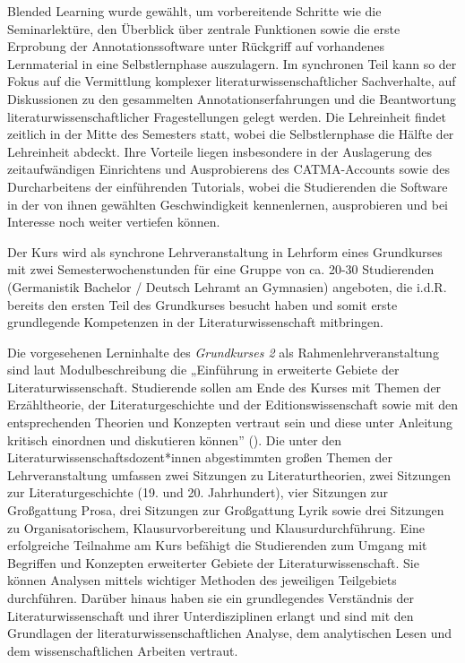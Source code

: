 \documentclass[
          a4paper,
        ]{article}
\begin{document}
Blended Learning wurde gewählt, um vorbereitende Schritte wie die
Seminarlektüre, den Überblick über zentrale Funktionen sowie die erste
Erprobung der Annotationssoftware unter Rückgriff auf vorhandenes
Lernmaterial in eine Selbstlernphase auszulagern. Im synchronen Teil
kann so der Fokus auf die Vermittlung komplexer
literaturwissenschaftlicher Sachverhalte, auf Diskussionen zu den
gesammelten Annotationserfahrungen und die Beantwortung
literaturwissenschaftlicher Fragestellungen gelegt werden. Die
Lehreinheit findet zeitlich in der Mitte des Semesters statt, wobei die
Selbstlernphase die Hälfte der Lehreinheit abdeckt. Ihre Vorteile liegen
insbesondere in der Auslagerung des zeitaufwändigen Einrichtens und
Ausprobierens des CATMA-Accounts sowie des Durcharbeitens der
einführenden Tutorials, wobei die Studierenden die Software in der von
ihnen gewählten Geschwindigkeit kennenlernen, ausprobieren und bei
Interesse noch weiter vertiefen können.

Der Kurs wird als synchrone Lehrveranstaltung in Lehrform eines
Grundkurses mit zwei Semesterwochenstunden für eine Gruppe von ca. 20-30
Studierenden (Germanistik Bachelor / Deutsch Lehramt an Gymnasien)
angeboten, die i.d.R. bereits den ersten Teil des Grundkurses besucht
haben und somit erste grundlegende Kompetenzen in der
Literaturwissenschaft mitbringen.

Die vorgesehenen Lerninhalte des \emph{Grundkurses 2} als
Rahmenlehrveranstaltung sind laut Modulbeschreibung die „Einführung in
erweiterte Gebiete der Literaturwissenschaft. Studierende sollen am Ende
des Kurses mit Themen der Erzähltheorie, der Literaturgeschichte und der
Editionswissenschaft sowie mit den entsprechenden Theorien und Konzepten
vertraut sein und diese unter Anleitung kritisch einordnen und
diskutieren können'' (). Die unter den
Literaturwissenschaftsdozent*innen abgestimmten großen Themen der
Lehrveranstaltung umfassen zwei Sitzungen zu Literaturtheorien, zwei
Sitzungen zur Literaturgeschichte (19. und 20. Jahrhundert), vier
Sitzungen zur Großgattung Prosa, drei Sitzungen zur Großgattung Lyrik
sowie drei Sitzungen zu Organisatorischem, Klausurvorbereitung und
Klausurdurchführung. Eine erfolgreiche Teilnahme am Kurs befähigt die
Studierenden zum Umgang mit Begriffen und Konzepten erweiterter Gebiete
der Literaturwissenschaft. Sie können Analysen mittels wichtiger
Methoden des jeweiligen Teilgebiets durchführen. Darüber hinaus haben
sie ein grundlegendes Verständnis der Literaturwissenschaft und ihrer
Unterdisziplinen erlangt und sind mit den Grundlagen der
literaturwissenschaftlichen Analyse, dem analytischen Lesen und dem
wissenschaftlichen Arbeiten vertraut.
\end{document}
